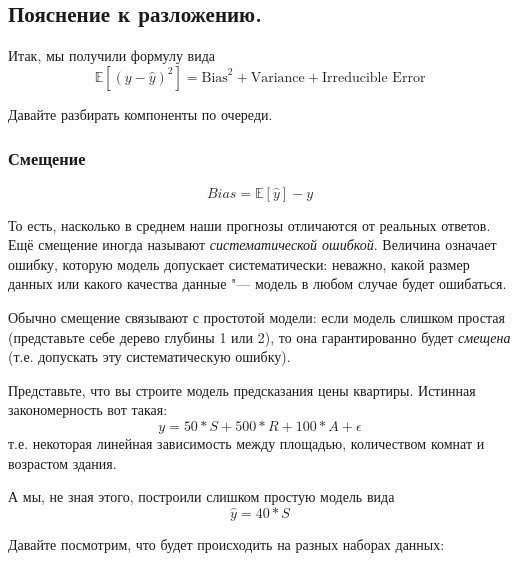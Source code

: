 \subsection*{Пояснение к разложению.}
Итак, мы получили формулу вида
\[
\mathbb{E}[(y - \hat{y})^2] = \text{Bias}^2 + \text{Variance} + \text{Irreducible Error}
\]

Давайте разбирать компоненты по очереди.
\subsubsection*{Смещение}
\[
Bias = \mathbb{E}[\hat{y}] - y
\]

То есть, насколько в среднем наши прогнозы отличаются от реальных ответов.
Ещё смещение иногда называют \textit{систематической ошибкой}. Величина означает ошибку, которую модель допускает систематически: неважно, какой размер данных или какого качества данные "--- модель в любом случае будет ошибаться.

Обычно смещение связывают с простотой модели: если модель слишком простая (представьте себе дерево глубины 1 или 2), то она гарантированно будет \textit{смещена} (т.е. допускать эту систематическую ошибку).

Представьте, что вы строите модель предсказания цены квартиры. Истинная закономерность вот такая:
\[
y = 50 * S + 500 * R + 100 * A + \epsilon
\]
т.е. некоторая линейная зависимость между площадью, количеством комнат и возрастом здания.

А мы, не зная этого, построили слишком простую модель вида
\[
\hat{y} = 40 * S
\]

\newpage
Давайте посмотрим, что будет происходить на разных наборах данных:

